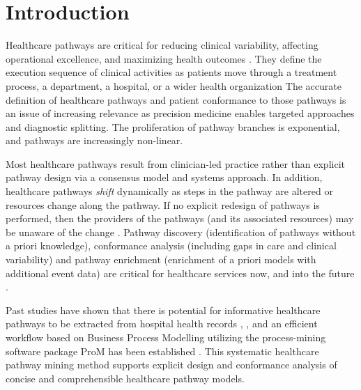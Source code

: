 \section{Introduction}
Healthcare pathways are critical for reducing clinical variability,
affecting operational excellence, and maximizing health outcomes
\cite{Lin2001}.
They define the execution sequence of clinical activities as patients move through a treatment process, a department, a hospital, or a wider health organization %
The accurate definition of healthcare pathways and patient conformance
to those pathways is an issue of increasing relevance as precision
medicine enables targeted approaches and diagnostic splitting.
The proliferation of pathway branches is exponential, and pathways are increasingly non-linear. 

Most healthcare pathways result from clinician-led practice rather
than explicit pathway design via a consensus model and systems
approach.
In addition, healthcare pathways \textit{shift} dynamically
as steps in the pathway are altered or resources change along the
pathway.
If no explicit redesign of pathways is performed, then the providers
of the pathways (and its associated resources) may be unaware of the
change \cite{Zhang2015}.
Pathway discovery (identification of pathways without a priori knowledge), conformance analysis (including gaps in care and clinical variability) and pathway enrichment (enrichment of a priori models with additional event data) are critical for healthcare services now, and into the future \cite{Baker2017}.

Past studies have shown that there is potential for informative
healthcare pathways to be extracted from hospital health records
\cite{Xu2017}, \cite{Iwata2013}, and an efficient workflow based on
Business Process Modelling utilizing the process-mining software
package ProM \cite{VanDongen2005} has been established
\cite{Mans2015_pathways, Neira2019_pathways}.
This systematic healthcare pathway mining method supports
explicit design and conformance analysis of concise and comprehensible
healthcare pathway models.

